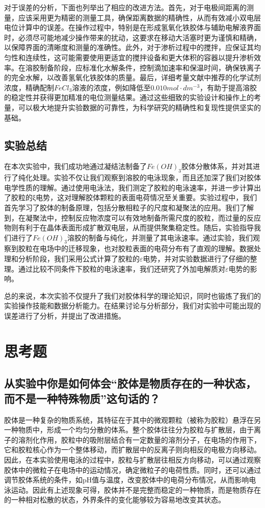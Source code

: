 \documentclass[12pt,hyperref,a4paper,UTF8]{ctexart}
\begin{document}
对于误差的分析，下面也列举出了相应的改进方法。首先，对于电极间距离的测量，应该采用更为精密的测量工具，确保距离数据的精确性，从而有效减小双电层电位计算中的误差。在操作过程中，特别是在形成氢氧化铁胶体与辅助电解液界面时，必须尽可能地减少操作带来的扰动，这要求在移动大活塞时更为谨慎和精确，以保障界面的清晰度和测量的准确性。此外，对于渗析过程中的搅拌，应保证其均匀性和连续性，这可能需要使用更适宜的搅拌设备和更大体积的容器以提升渗析效率。在溶胶制备阶段，应标准化水解条件，控制滴加速率和保温时间，确保铁离子的完全水解，以改善氢氧化铁胶体的质量。最后，详细考量文献中推荐的化学试剂浓度，精确配制$FeCl_3$溶液的浓度，例如降低至$0.010mol\cdot dm^{-3}$，有助于提高溶胶的稳定性并获得更加精准的电位测量结果。通过这些细致的实验设计和操作上的考量，可以极大地提升实验数据的可靠性，为科学研究的精确性和复现性提供坚实的基础。


\subsection{实验总结}
在本次实验中，我们成功地通过凝结法制备了$Fe(OH)_3$胶体分散体系，并对其进行了纯化处理。实验不仅让我们观察到溶胶的电泳现象，而且还加深了我们对胶体电学性质的理解。通过使用电泳法，我们测定了胶粒的电泳速率，并进一步计算出了胶粒的ξ电势，这对理解胶体颗粒的表面电荷情况至关重要。实验过程中，我们首先学习了胶体的制备原理，包括分散相粒子的尺度和凝聚法的应用。我们了解到，在凝聚法中，控制反应物浓度可以有效地制备所需尺度的胶粒，而过量的反应物则有利于在晶体表面形成扩散双电层，从而提供聚集稳定性。随后，实验指导我们进行了$Fe(OH)_3$溶胶的制备与纯化，并测量了其电泳速率。通过实验，我们观察到胶粒在电场中的迁移现象，也对胶粒表面的电荷分布有了直观的理解。数据处理和分析阶段，我们采用公式计算了胶粒的$\varepsilon$电势，并对实验数据进行了仔细的整理。通过比较不同条件下胶粒的电泳速率，我们还研究了外加电解质对$\varepsilon$电势的影响。

总的来说，本次实验不仅提升了我们对胶体科学的理论知识，同时也锻炼了我们的实验操作技能和数据分析能力。在结果讨论与分析部分，我们对实验中可能出现的误差进行了分析，并提出了改进措施。

\section{思考题}
\subsection{从实验中你是如何体会“胶体是物质存在的一种状态，而不是一种特殊物质”这句话的？}

    胶体是一种复杂的物质系统，其特征在于其中的微观颗粒（被称为胶粒）悬浮在另一种物质中，形成一个均匀分散的体系。整个胶体往往分为胶粒与扩散层，由于离子的溶剂化作用，胶粒中的吸附层结合有一定数量的溶剂分子，在电场的作用下，它和胶粒核心作为一个整体移动，而扩散层中的反离子则向相反的电极方向移动。因此，在本实验使用电泳的过程中，胶粒与扩散层往相反方向移动，可以通过观察胶体中的微粒子在电场中的运动情况，确定微粒子的电荷性质。同时，还可以通过调节胶体系统的条件，如pH值与温度，改变胶体中的电荷分布情况，从而影响电泳运动。因此有上述现象可得，胶体并不是完整而稳定的一种物质，而是物质存在的一种相对松散的状态，外界条件的变化能够较为容易地改变其状态。
\end{document}
